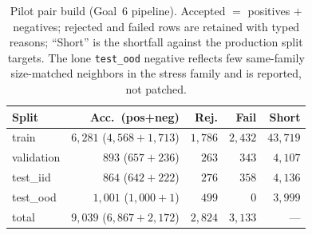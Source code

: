 \documentclass[11pt]{article}
\begin{document}
\begin{table}[h]
\centering
\small
\setlength{\tabcolsep}{4pt}
\renewcommand{\arraystretch}{1.1}
\begin{tabular}{@{}lrrrr@{}}
\toprule
\textbf{Split} & \textbf{Acc.\ (pos+neg)} & \textbf{Rej.} & \textbf{Fail} & \textbf{Short} \\
\midrule
train      & $6{,}281$ ($4{,}568{+}1{,}713$) & $1{,}786$ & $2{,}432$ & $43{,}719$ \\
validation & $893$ ($657{+}236$)             & $263$     & $343$     & $4{,}107$ \\
test\_iid  & $864$ ($642{+}222$)             & $276$     & $358$     & $4{,}136$ \\
test\_ood  & $1{,}001$ ($1{,}000{+}1$)       & $499$     & $0$       & $3{,}999$ \\
\midrule
total      & $9{,}039$ ($6{,}867{+}2{,}172$) & $2{,}824$ & $3{,}133$ & --- \\
\bottomrule
\end{tabular}
\caption{Pilot pair build (Goal~6 pipeline). Accepted $=$ positives $+$ negatives;
rejected and failed rows are retained with typed reasons; ``Short'' is the
shortfall against the production split targets. The lone \texttt{test\_ood}
negative reflects few same-family size-matched neighbors in the stress family and
is reported, not patched.}
\label{tab:pilot}
\end{table}
\end{document}
